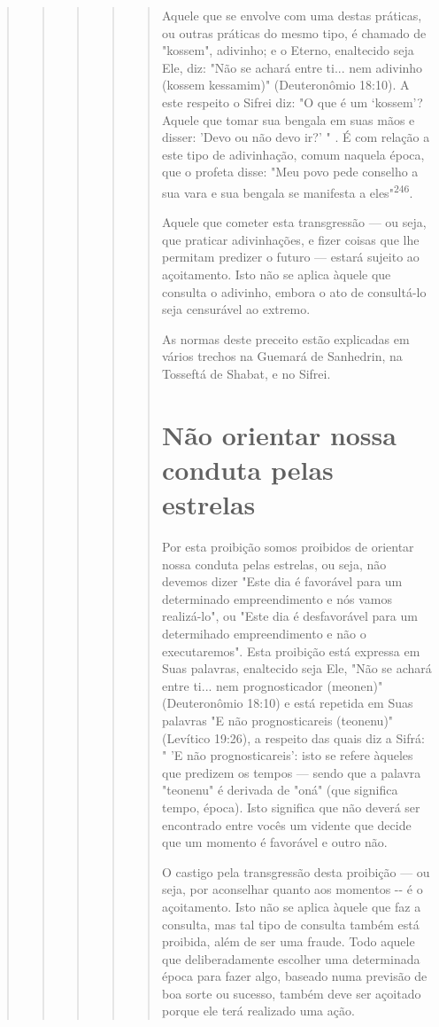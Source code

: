 \begin{quote}
\begin{quote}
\begin{quote}
\begin{quote}
\begin{quote}
Aquele que se envolve com uma destas práticas, ou outras práticas do
mesmo tipo, é chamado de "kossem", adivinho; e o Eterno, enaltecido seja
Ele, diz: "Não se achará entre ti... nem adivinho (kossem kessamim)"
(Deutero­nômio 18:10). A este respeito o Sifrei diz: "O que é um
`kossem'? Aquele que tomar sua bengala em suas mãos e disser: 'Devo ou
não devo ir?' " . É com rela­ção a este tipo de adivinhação, comum
naquela época, que o profeta disse: "Meu povo pede conselho a sua vara e
sua bengala se manifesta a eles"\textsuperscript{246}.

Aquele que cometer esta transgressão --- ou seja, que praticar
adivi­nhações, e fizer coisas que lhe permitam predizer o futuro ---
estará sujeito ao açoitamento. Isto não se aplica àquele que consulta o
adivinho, embora o ato de consultá-lo seja censurável ao extremo.

As normas deste preceito estão explicadas em vários trechos na Gue­mará
de Sanhedrin, na Tosseftá de Shabat, e no Sifrei.

\section{Não orientar nossa conduta pelas estrelas}

Por esta proibição somos proibidos de orientar nossa conduta pelas
estrelas, ou seja, não devemos dizer "Este dia é favorável para um
determinado empreendimento e nós vamos realizá-lo", ou "Este dia é
desfavorável para um determihado empreendimento e não o executaremos".
Esta proibição está ex­pressa em Suas palavras, enaltecido seja Ele,
"Não se achará entre ti... nem prog­nosticador (meonen)" (Deuteronômio
18:10) e está repetida em Suas palavras "E não prognosticareis
(teonenu)" (Levítico 19:26), a respeito das quais diz a Sifrá: " 'E não
prognosticareis': isto se refere àqueles que predizem os tempos ---
sendo que a palavra "teonenu" é derivada de "oná" (que significa tempo,
época). Isto significa que não deverá ser encontrado entre vocês um
vidente que decide que um momento é favorável e outro não.

O castigo pela transgressão desta proibição --- ou seja, por aconse­lhar
quanto aos momentos -\/- é o açoitamento. Isto não se aplica àquele que
faz a consulta, mas tal tipo de consulta também está proibida, além de
ser uma fraude. Todo aquele que deliberadamente escolher uma determinada
época para fazer algo, baseado numa previsão de boa sorte ou sucesso,
também deve ser açoitado porque ele terá realizado uma ação.


\end{quote}
\end{quote}
\end{quote}
\end{quote}
\end{quote}
